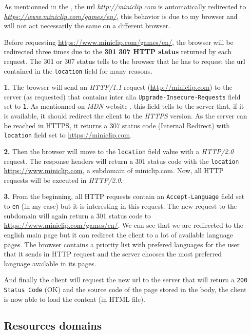 \documentclass{article}
\newcommand{\link}[1]{\href{#1}{\textit{#1}}}
\begin{document}
As mentionned in the , the url \link{http://miniclip.com} is automatically redirected to \link{https://www.miniclip.com/games/en/}, this behavior is due to my browser and will not act necessarily the same on a different browser. 

Before requesting \url{https://www.miniclip.com/games/en/}, the browser will be redirected three times due to the \textbf{301  307 HTTP status} returned by each request. The 301 or 307 status tells to the browser that he has to request the url contained in the \texttt{location} field for many reasons.


\textbf{1.}
The browser will send an \textit{HTTP/1.1} request (\url{http://miniclip.com}) to the server (as requested) that contains inter alia \texttt{Upgrade-Insecure-Requests} field set to \texttt{1}. As mentionned on \textit{MDN} website \cite{upgrade-insecure-request}, this field tells to the server that, if it is available, it should redirect the client to the \textit{HTTPS} version. As the server can be reached in HTTPS, it returns a 307 status code (Internal Redirect) with \texttt{location} field set to \url{https://miniclip.com}.

\textbf{2.} 
Then the browser will move to the \texttt{location} field value with a \textit{HTTP/2.0} request. The response headers will return a 301 status code with the \texttt{location} \url{https://www.miniclip.com}, a subdomain of miniclip.com. Now, all HTTP requests will be executed in \textit{HTTP/2.0}.

\textbf{3.}
From the beginning, all HTTP requests contain an \texttt{Accept-Language} field set to \texttt{en} (in my case) but it is interesting in this request. The new request to the subdomain will again return a 301 status code to \url{https://www.miniclip.com/games/en/}. We can see that we are redirected to the english main page but it can redirect the client to a lot of available language pages. The browser contains a priority list with prefered languages for the user that it sends in HTTP request and the server chooses the most preferred language available in its pages.

And finally the client will request the new url to the server that will return a \texttt{200 Status Code} (OK) and the
source code of the page stored in the body, the client is now able to load the content (in HTML file).

\subsection{Resources domains}
\label{sub:resdom}
\end{document}

